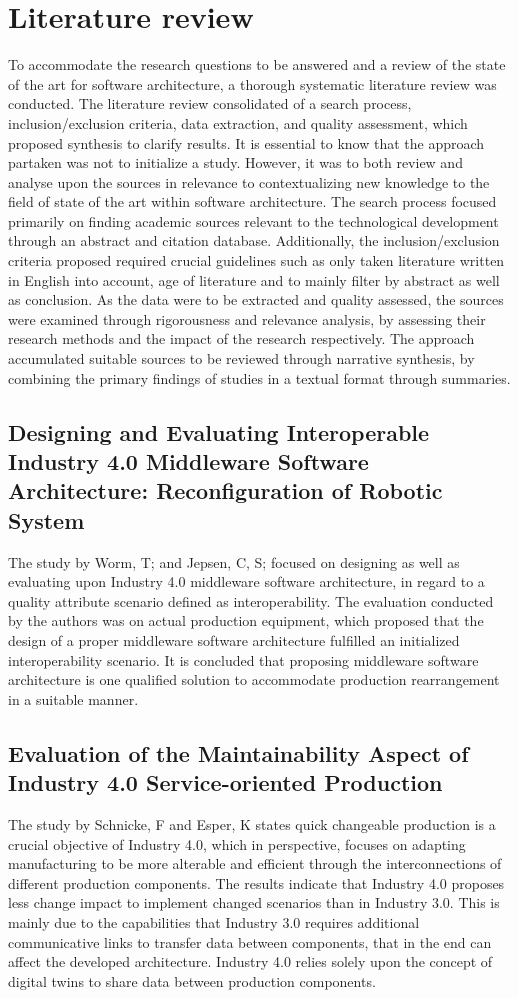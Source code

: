 \section{Literature review}
To accommodate the research questions to be answered and a review of the state of the art for software architecture, a thorough systematic literature review was conducted. The literature review consolidated of a search process, inclusion/exclusion criteria, data extraction, and quality assessment, which proposed synthesis to clarify results. It is essential to know that the approach partaken was not to initialize a study. However, it was to both review and analyse upon the sources in relevance to contextualizing new knowledge to the field of state of the art within software architecture. The search process focused primarily on finding academic sources relevant to the technological development through an abstract and citation database. Additionally, the inclusion/exclusion criteria proposed required crucial guidelines such as only taken literature written in English into account, age of literature and to mainly filter by abstract as well as conclusion. As the data were to be extracted and quality assessed, the sources were examined through rigorousness and relevance analysis, by assessing their research methods and the impact of the research respectively. The approach accumulated suitable sources to be reviewed through narrative synthesis, by combining the primary findings of studies in a textual format through summaries.
\subsection{Designing and Evaluating Interoperable Industry 4.0 Middleware Software Architecture: Reconfiguration of Robotic System}
The study by Worm, T; and Jepsen, C, S; focused on designing as well as evaluating upon Industry 4.0 middleware software architecture, in regard to a quality attribute scenario defined as interoperability. The evaluation conducted by the authors was on actual production equipment, which proposed that the design of a proper middleware software architecture fulfilled an initialized interoperability scenario. It is concluded that proposing middleware software architecture is one qualified solution to accommodate production rearrangement in a suitable manner\cite{Jepsen2023205}.
\subsection{Evaluation of the Maintainability Aspect of Industry 4.0 Service-oriented Production}
The study by Schnicke, F and Esper, K states quick changeable production is a crucial objective of Industry 4.0, which in perspective, focuses on adapting manufacturing to be more alterable and efficient through the interconnections of different production components. The results indicate that Industry 4.0 proposes less change impact to implement changed scenarios than in Industry 3.0. This is mainly due to the capabilities that Industry 3.0 requires additional communicative links to transfer data between components, that in the end can affect the developed architecture. Industry 4.0 relies solely upon the concept of digital twins to share data between production components\cite{Esper20208}.
